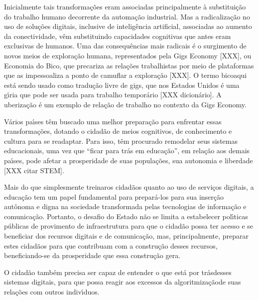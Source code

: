 \documentclass[
12pt,		%
openright,	%
twoside,  %
a4paper,			%
chapter=TITLE,		%
english,			%
french,				%
spanish,			%
brazil				%
]{USPSC-classe/USPSC}
\begin{document}
Inicialmente tais transforma\c{c}\~oes eram associadas principalmente \`a substitui\c{c}\~ao do trabalho humano decorrente da automa\c{c}\~ao industrial. Mas a radicaliza\c{c}\~ao no uso de solu\c{c}\~oes digitais, inclusive de intelig\^encia artificial, associadas ao aumento da conectividade, v\^em substituindo capacidades \textquotedbl cognitivas que antes eram exclusivas de humanos\textquotedbl [4 XXX]. Uma das consequ\^encias mais radicais \'e o surgimento de novos meios de explora\c{c}\~ao humana, representados pela \textquotedbl Gigs Economy [XXX], ou \textquotedbl Economia do Bico\textquotedbl , que precariza as rela\c{c}\~oes trabalhistas por meio de plataformas que as impessoaliza a ponto de camuflar a explora\c{c}\~ao [XXX]. O termo \textquotedbl bico\textquotedbl  aqui est\'a sendo usado como tradu\c{c}\~ao livre de \textquotedbl gigs\textquotedbl , que nos Estados Unidos \'e uma g\'{\i}ria que pode ser usada para trabalho tempor\'ario [XXX dicion\'ario]. A uberiza\c{c}\~ao \'e um exemplo de rela\c{c}\~ao de trabalho no contexto da Gigs Economy.


V\'arios pa\'{\i}ses t\^em buscado uma melhor prepara\c{c}\~ao para enfrentar essas transforma\c{c}\~oes, dotando o cidad\~ao de meios cognitivos, de conhecimento e cultura para se readaptar. Para isso, t\^em procurado remodelar seus sistemas educacionais, uma vez que “ficar para tr\'as em educa\c{c}\~ao”, em rela\c{c}\~ao aos demais pa\'{\i}ses, pode afetar a prosperidade de suas popula\c{c}\~oes, sua autonomia e liberdade [XXX citar STEM].


Mais do que simplesmente \textquotedbl treinar\textquotedbl  os cidad\~aos quanto ao uso  de servi\c{c}os digitais, a educa\c{c}\~ao tem um papel fundamental para prepar\'a-los para sua inser\c{c}\~ao aut\^onoma e digna na sociedade transformada pelas tecnologias de informa\c{c}\~ao e comunica\c{c}\~ao. Portanto, o desafio do Estado n\~ao se limita a estabelecer pol\'{\i}ticas p\'ublicas de provimento de infraestrutura para que o cidad\~ao possa ter acesso e se beneficiar dos recursos digitais e de comunica\c{c}\~ao, mas, principalmente, preparar estes cidad\~aos para que contribuam com a  constru\c{c}\~ao desses recursos, beneficiando-se da prosperidade que  essa constru\c{c}\~ao gera.


O cidad\~ao tamb\'em precisa ser capaz de entender \textquotedbl o que est\'a por tr\'as\textquotedbl  desses sistemas digitais, para que possa reagir aos excessos da \textquotedbl algoritmiza\c{c}\~ao\textquotedbl  de suas rela\c{c}\~oes com outros indiv\'{\i}duos.
\end{document}

